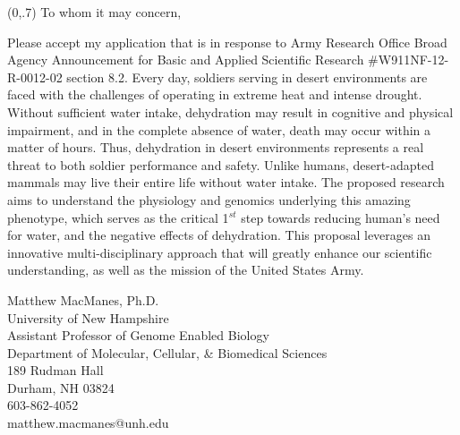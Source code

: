 \documentclass[12pt]{article}
\begin{document}
\textsc{ }

\vspace{20 mm}
\begin{textblock}{12.4}(0,.7)
\parindent 0.000000001in
To whom it may concern, 

\parindent 0.2in
\vspace{6 mm}
Please accept my application that is in response to Army Research Office Broad Agency Announcement for Basic and Applied Scientific Research \#W911NF-12-R-0012-02 section 8.2. Every day, soldiers serving in desert environments are faced with the challenges of operating in extreme heat and intense drought. Without sufficient water intake, dehydration may result in cognitive and physical impairment, and in the complete absence of water, death may occur within a matter of hours. Thus, dehydration in desert environments represents a real threat to both soldier performance and safety.  Unlike humans, desert-adapted mammals may live their entire life without water intake. The proposed research aims to understand the physiology and genomics underlying this amazing phenotype, which serves as the critical 1$^{st}$ step towards reducing human's need for water, and the negative effects of dehydration. This proposal leverages an innovative multi-disciplinary approach that will greatly enhance our scientific understanding, as well as the mission of the United States Army. 


\vspace{20mm}
\noindent Matthew MacManes, Ph.D. \hfill \\
University of New Hampshire \\
Assistant Professor of Genome Enabled Biology\\
Department of Molecular, Cellular, \& Biomedical Sciences\\
189 Rudman Hall\\
Durham, NH  03824\\
603-862-4052 \\
matthew.macmanes@unh.edu \\

\end{textblock}
\end{document}

